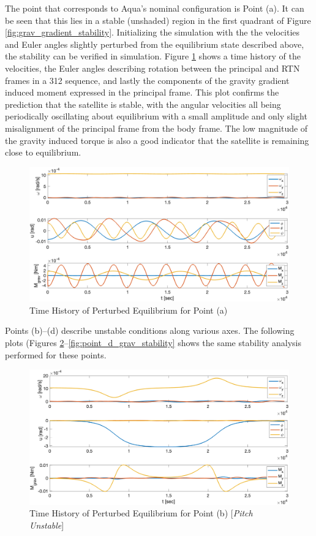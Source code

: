 The point that corresponds to Aqua's nominal configuration is Point (a). It can be seen that this lies in a stable (unshaded) region in the first quadrant of Figure \ref{fig:grav_gradient_stability}. Initializing the simulation with the the velocities and Euler angles slightly perturbed from the equilibrium state described above, the stability can be verified in simulation. Figure \ref{fig:point_a_grav_stability} shows a time history of the velocities, the Euler angles describing rotation between the principal and RTN frames in a 312 sequence, and lastly the components of the gravity gradient induced moment expressed in the principal frame. This plot confirms the prediction that the satellite is stable, with the angular velocities all being periodically oscillating about equilibrium with a small amplitude and only slight misalignment of the principal frame from the body frame. The low magnitude of the gravity induced torque is also a good indicator that the satellite is remaining close to equilibrium.

\begin{figure}[H]
    \centering
    \captionsetup{justification = centering}
    \includegraphics[width = 12cm]{Images/PS5/point_a_grav_stability.png}
    \caption{Time History of Perturbed Equilibrium for Point (a)}
    \label{fig:point_a_grav_stability}
\end{figure}

Points (b)--(d) describe unstable conditions along various axes. The following plots (Figures \ref{fig:point_b_grav_stability}--\ref{fig:point_d_grav_stability} shows the same stability analysis performed for these points.

\begin{figure}[H]
    \centering
    \captionsetup{justification = centering}
    \includegraphics[width = 12cm]{Images/PS5/point_b_grav_stability.png}
    \caption{Time History of Perturbed Equilibrium for Point (b) [\emph{Pitch Unstable}]}
    \label{fig:point_b_grav_stability}
\end{figure}

